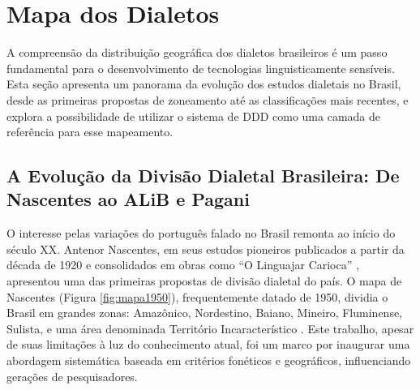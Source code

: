 \chapter{Mapa dos Dialetos}
A compreensão da distribuição geográfica dos dialetos brasileiros é um passo fundamental para o desenvolvimento de tecnologias linguisticamente sensíveis. Esta seção apresenta um panorama da evolução dos estudos dialetais no Brasil, desde as primeiras propostas de zoneamento até as classificações mais recentes, e explora a possibilidade de utilizar o sistema de DDD como uma camada de referência para esse mapeamento.

\section{A Evolução da Divisão Dialetal Brasileira: De Nascentes ao ALiB e Pagani}


O interesse pelas variações do português falado no Brasil remonta ao início do século XX. Antenor Nascentes, em seus estudos pioneiros publicados a partir da década de 1920 e consolidados em obras como ``O Linguajar Carioca'' \cite{nascentes1953}, apresentou uma das primeiras propostas de divisão dialetal do país. O mapa de Nascentes (Figura \ref{fig:mapa1950}), frequentemente datado de 1950, dividia o Brasil em grandes zonas: Amazônico, Nordestino, Baiano, Mineiro, Fluminense, Sulista, e uma área denominada Território Incaracterístico \cite{nascentes1953}. Este trabalho, apesar de suas limitações à luz do conhecimento atual, foi um marco por inaugurar uma abordagem sistemática baseada em critérios fonéticos e geográficos, influenciando gerações de pesquisadores.



